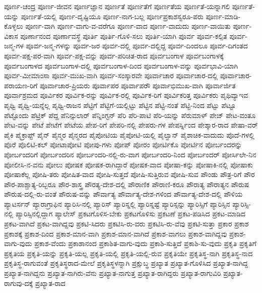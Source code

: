 {ಪೂರ್ಣ-ಚಂದ್ರ
ಪೂರ್ಣ-ಜೀವನ
ಪೂರ್ಣಜ್ಞಾನ
ಪೂರ್ಣತೆ
ಪೂರ್ಣತೆಗೆ
ಪೂರ್ಣತೆಯ
ಪೂರ್ಣತೆ-ಯನ್ನಾಗಲಿ
ಪೂರ್ಣತೆ-ಯನ್ನು
ಪೂರ್ಣತೆ-ಯಲ್ಲಿ
ಪೂರ್ಣ-ದೃಷ್ಟಿಯೂ
ಪೂರ್ಣ-ನಾಗ-ಬಲ್ಲ
ಪೂರ್ಣಪ್ರಕಾಶಸ್ವರೂ-ಪರು
ಪೂರ್ಣ-ಮಾಡಿ-ಕೊಳ್ಳಲು
ಪೂರ್ಣ-ವಾಗಿ
ಪೂರ್ಣ-ವಾಗು-ವ-ವರೆಗೂ
ಪೂರ್ಣ-ವಾದ
ಪೂರ್ಣ-ವಾದುದು
ಪೂರ್ಣ-ವಾಯಿತು
ಪೂರ್ಣ-ವಿಕಾಸ
ಪೂರ್ಣಾನಂದ
ಪೂರ್ಣಾವಸ್ಥೆ
ಪೂರ್ತಿ
ಪೂರ್ತಿ-ಗೊಳಿ-ಸಲು
ಪೂರ್ತಿ-ಯಾಗಿ
ಪೂರ್ವ
ಪೂರ್ವ-ಕಲ್ಪಿತ
ಪೂರ್ವ-ಜನ್ಮ-ಗಳ
ಪೂರ್ವ-ಜನ್ಮ-ಗಳನ್ನು
ಪೂರ್ವ-ಜರ
ಪೂರ್ವ-ದಲ್ಲಿ
ಪೂರ್ವ-ದಲ್ಲಿದ್ದ
ಪೂರ್ವ-ದಿಂದಲೂ
ಪೂರ್ವ-ದಿಗಂತದ
ಪೂರ್ವ-ಪಕ್ಷ-ಪರ-ವಾಗಿ
ಪೂರ್ವ-ಪಕ್ಷ-ವನ್ನು
ಪೂರ್ವ-ಪರಿಚಿತ-ರಾದ
ಪೂರ್ವಬಂಗಾಳ
ಪೂರ್ವಬಂಗಾಳಕ್ಕೆ
ಪೂರ್ವಬಂಗಾಳದ
ಪೂರ್ವಬಂಗಾಳ-ದಲ್ಲಿ
ಪೂರ್ವಬಂಗಾಳ-ದಿಂದ
ಪೂರ್ವಬಂಗಾಳ-ವನ್ನು
ಪೂರ್ವಭಾವಿ-ಯಾಗಿ
ಪೂರ್ವ-ಮೀಮಾಂಸಾ
ಪೂರ್ವ-ಮುಖ-ವಾಗಿ
ಪೂರ್ವ-ಸಂಸ್ಕಾರವೇ
ಪೂರ್ವಾಚಾರ
ಪೂರ್ವಾಚಾರ-ದಲ್ಲಿ
ಪೂರ್ವಾಚಾರ-ಪರಾಯಣ-ರಿಗೆ
ಪೂರ್ವಾಚಾರ-ಪ್ರಿಯರು
ಪೂರ್ವಾಪರ
ಪೂರ್ವಾಪರೌ
ಪೂರ್ವಾಭಿಮುಖ-ವಾಗಿ
ಪೂರ್ವಾರ್ಜಿತ
ಪೂರ್ವಾಶ್ರಮದ
ಪೂರ್ವಿಕರ
ಪೂರ್ವಿಕ-ರನ್ನು
ಪೂರ್ವಿಕ-ರಲ್ಲಿ
ಪೂರ್ವಿಕ-ರಿಗೆ
ಪೂರ್ವಿಕರಿತ್ತ
ಪೂರ್ವಿಕರು
ಪೃಥಿವ್ಯಾಇವ
ಪೃಥ್ವಿ
ಪೃಥ್ವಿ-ಯನ್ನೆಲ್ಲ
ಪೃಥ್ವಿ-ರಾಜನ
ಪೆಟ್ಟಿಗೆ
ಪೆಟ್ಟಿಗೆ-ಯಲ್ಲಿಟ್ಟು
ಪೆಟ್ಟಿನ
ಪೆಟ್ಟಿ-ನಂತೆ
ಪೆಟ್ಟಿ-ನಿಂದ
ಪೆಟ್ಟು
ಪೆಟ್ಟೂ
ಪೆಟ್ಟೊಂದು
ಪೆಟ್ರಿಕ್
ಪೆದ್ದ
ಪೆನಿನ್ಸುಲಾರ್
ಪೆನ್ನಿಂಗ್ಟನ್
ಪೆರಿ
ಪೆರಿ-ಪಾಟಿ
ಪೆರಿ-ಯನ್ನು
ಪೆರುಮಾಳ್
ಪೇಜ್
ಪೇಟ-ವಂತೂ
ಪೇಟ-ವನ್ನು
ಪೇಟೆ
ಪೇಟೆಗೆ
ಪೇಟೆಯ
ಪೇಪ-ರಿಗೆ
ಪೇಪರಿ-ನಲ್ಲಿ
ಪೇಪರು-ಗಳ
ಪೇಪರ್ಸ್ನಿಂದ
ಪೇಶ್ಕಾರ-ರಾದ
ಪೇಷಾ-ವರ್
ಪೈಕಿ
ಪೈಕ್ರಾಪ್ಟ್
ಪೈನ್
ಪೈನ್ಮರ
ಪೈನ್ಮರದ
ಪೈಪೋಟಿಯ
ಪೈಪೋಟಿ-ಯಲ್ಲಿ
ಪೈಲ್ವಾನ್
ಪೈಶಾಚಿಕ-ವಾದುದು
ಪೊದೆ-ಗಳಲ್ಲಿ
ಪೊರೆ
ಪೊಲಿಟಿ-ಕಲ್
ಪೋಟಾಪೋಟಿ
ಪೋಪು-ಗಳು
ಪೋಪ್
ಪೋರಂ
ಪೋರ್ಟಿಕೊ
ಪೋರ್ಟಿನ
ಪೋರ್ಬಂದರನ್ನು
ಪೋರ್ಬಂದರಿಗೆ
ಪೋರ್ಬಂದರಿನ
ಪೋರ್ಬಂದರಿ-ನಲ್ಲಿ-ರು-ವಾಗ
ಪೋರ್ಬಂದರಿ-ನಿಂದ
ಪೋರ್ಬಂದರ್
ಪೋರ್ಸಿಲೇ-ನಿನ
ಪೋಲೀಸಿ-ನ-ವನು
ಪೋಲು
ಪೋಷಕ
ಪೋಷಕ-ರಾಗಿದ್ದಾರೆ
ಪೋಷಕ-ವಾದ
ಪೋಷಾ-ಕನ್ನು
ಪೋಷಾಕಿ-ನಲ್ಲಿ
ಪೋಷಾಕು
ಪೋಷಾಕೆಲ್ಲ
ಪೋಷಿ-ತರು
ಪೋಷಿತ-ವಾದ
ಪೋಷಿ-ಸುತ್ತದೆ
ಪೋಷಿ-ಸುತ್ತಿರುವ
ಪೋಷಿ-ಸುವ
ಪೌಂಡು
ಪೌತ್ರ-ರಿಗೆ
ಪೌರ
ಪೌರ-ಪಾಶ್ಚಾತ್ಯ-ರಿಬ್ಬರೂ
ಪೌರ-ಶಾಸ್ತ್ರ
ಪೌರತ್ಯ-ದೇಶ-ದಲ್ಲಿ
ಪೌರಾಣಿಕ
ಪೌರಾಣಿ-ಕರೂ
ಪೌರಾತ್ಯ
ಪೌರಾತ್ಯನ
ಪೌರುಷ
ಪೌರುಷ-ದಲ್ಲಿ-ರು-ವಂತೆ
ಪೌರುಷ-ವನ್ನು
ಪೌರ್ವಾತ್ಯ
ಪೌರ್ವಾತ್ಯ-ದೇಶ-ಗಳಿಂದ
ಪೌರ್ವಾತ್ಯ-ದೇಶ-ದಲ್ಲಿ
ಪೌಳಿಯ
ಪ್ಯಾಟರ್ಸನ್
ಪ್ಯಾರಾಗ್ರಾಫಿನ
ಪ್ಯಾರಿಸಿ-ನಲ್ಲಿ
ಪ್ಯಾರಿಸ್
ಪ್ಯಾರಿಸ್ನಲ್ಲಿ
ಪ್ಯಾರಿಸ್ನಷ್ಟೆ
ಪ್ಯಾರಿಸ್ಸನ್ನು
ಪ್ಯಾರಿಸ್ಸಿಗೆ
ಪ್ಯಾರಿಸ್ಸಿನ
ಪ್ಯಾರಿಸ್ಸಿ-ನಲ್ಲಿ
ಪ್ಯಾರಿಸ್ಸಿನಲ್ಲಿದ್ದಾಗ
ಪ್ಯಾಲೇಸ್
ಪ್ರಕಟಗೊಳಿಸ-ಬೇಕು
ಪ್ರಕಟಗೊಳಿಸು
ಪ್ರಕಟಣೆ
ಪ್ರಕಟ-ಪಡಿಸಿದ
ಪ್ರಕಟ-ಮಾಡಿದ
ಪ್ರಕಟ-ವಾಗಿದೆ
ಪ್ರಕಟ-ವಾಗಿದ್ದವು
ಪ್ರಕಟಿ-ಸಿದರು
ಪ್ರಕಟಿಸಿ-ರು-ವರು
ಪ್ರಕಟಿಸಿ-ರು-ವೆವು
ಪ್ರಕಟಿ-ಸುತ್ತಾ
ಪ್ರಕಾರ
ಪ್ರಕಾಶ
ಪ್ರಕಾಶಕ್ಕೆ
ಪ್ರಕಾಶ-ದಿಂದ
ಪ್ರಕಾಶ-ಮಾನ-ವಾಗಿ
ಪ್ರಕಾಶ-ಮಾನ-ವಾಗಿದೆ
ಪ್ರಕಾಶ-ವಾಗಲು
ಪ್ರಕಾಶ-ವಾಗಿದ್ದವು
ಪ್ರಕಾಶ-ವಾಗು-ವುದು
ಪ್ರಕಾಶ-ವೆಂದು
ಪ್ರಕಾಶಾನಂದ
ಪ್ರಕಾಶಿತ-ವಾಗು-ವುದು
ಪ್ರಕಾಶಿ-ಸುತ್ತಿದೆ
ಪ್ರಕಾಶಿ-ಸು-ವುದು
ಪ್ರಕೃತಿ
ಪ್ರಕೃತಿಗೆ
ಪ್ರಕೃತಿಯ
ಪ್ರಕೃತಿ-ಯನ್ನು
ಪ್ರಕೃತಿ-ಯಲ್ಲ
ಪ್ರಕೃತಿ-ಯಲ್ಲಿ
ಪ್ರಕೃತಿ-ಯಲ್ಲಿ-ರುವ
ಪ್ರಕೃತಿಯೇ
ಪ್ರಕೃತಿಸ್ಥ-ನಾಗಿ
ಪ್ರಕೃತಿಸ್ಥ-ನಾದ
ಪ್ರಕೃತಿಸ್ಥ-ರಾಗುವಂತೆ
ಪ್ರಕೃತಿಸ್ಥರಾದ-ಮೇಲೆ
ಪ್ರಕೃತಿಸ್ಥಳನ್ನಾಗಿ
ಪ್ರಕ್ಷುಬ್ಧ
ಪ್ರಖ್ಯಾತ
ಪ್ರಖ್ಯಾತ-ಗೊಳಿಸಿದ
ಪ್ರಖ್ಯಾತ-ನಾಗಿದ್ದ
ಪ್ರಖ್ಯಾತ-ನಾಗಿದ್ದನು
ಪ್ರಖ್ಯಾತ-ನಾಗಿರು-ವೆನು
ಪ್ರಖ್ಯಾತ-ನಾಗುತ್ತ
ಪ್ರಖ್ಯಾತ-ರಾಗಿದ್ದರು
ಪ್ರಖ್ಯಾತ-ರಾಗುವಿರಿ
ಪ್ರಖ್ಯಾತ-ರಾಗುವು-ದಕ್ಕೆ
ಪ್ರಖ್ಯಾತ-ರಾದ
}
